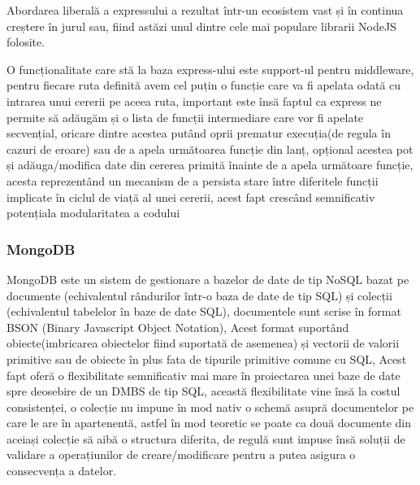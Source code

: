 \documentclass[12pt,a4paper,hidelinks]{report}
\theoremstyle{definition}
\theoremstyle{remark}
\begin{document}
Abordarea liberală a expressului a rezultat într-un ecosistem vast și în continua creștere în jurul sau, fiind astăzi unul dintre cele mai populare librarii NodeJS folosite.

O funcționalitate care stă la baza express-ului este support-ul pentru middleware, pentru fiecare ruta definită avem cel puțin o funcție care va fi apelata odată cu intrarea
unui cererii pe aceea ruta,
important este însă faptul ca express ne permite să adăugăm și o lista de funcții intermediare care vor fi apelate secvențial, oricare dintre acestea putând oprii prematur execuția(de regula în cazuri de eroare) 
sau de a apela următoarea funcție din lanț, opțional acestea pot și adăuga/modifica date din cererea primită înainte de a apela următoare funcție, 
acesta reprezentând un mecanism de a persista stare între diferitele funcții implicate în ciclul de viață al unei cererii, acest fapt crescând semnificativ potențiala modularitatea a codului
\subsubsection{MongoDB}
MongoDB\cite{4} este un sistem de gestionare a bazelor de date de tip NoSQL bazat pe documente
(echivalentul rândurilor într-o baza de date de tip SQL) și colecții (echivalentul tabelelor în baze de date SQL), 
documentele sunt scrise în format BSON (Binary Javascript Object Notation), 
Acest format suportând obiecte(imbricarea obiectelor fiind suportată de asemenea) și vectorii 
de valorii primitive sau de obiecte în plus fata de tipurile primitive comune cu SQL, 
Acest fapt oferă o flexibilitate semnificativ mai mare în proiectarea 
unei baze de date spre deosebire de un DMBS de tip SQL, 
această flexibilitate vine însă la costul consistenței, o colecție nu impune 
în mod nativ o schemă asupră documentelor pe care le are în apartenentă, 
astfel în mod teoretic se poate ca două documente din aceiași colecție să aibă o structura diferita, 
de regulă sunt impuse însă soluții de validare a operațiunilor de creare/modificare 
pentru a putea asigura o consecvența a datelor.
\end{document}
